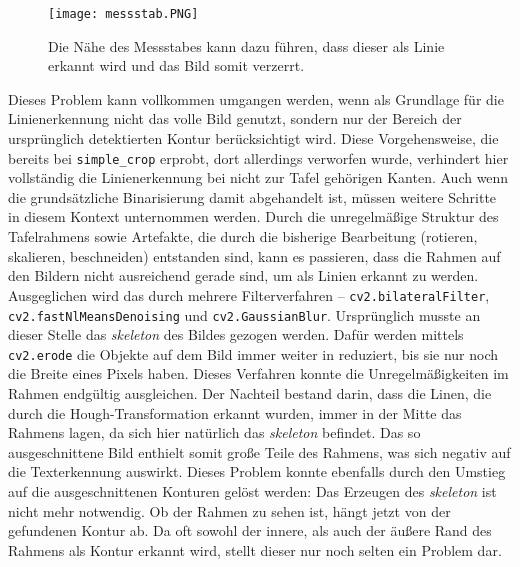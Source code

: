 \begin{SCfigure}[1][h!]
\caption{Die Nähe des Messstabes kann dazu führen, dass dieser als Linie erkannt wird und das Bild somit verzerrt.}
\texttt{[image: messstab.PNG]}
\end{SCfigure}

Dieses Problem kann vollkommen umgangen werden, wenn als Grundlage für die Linienerkennung nicht das volle Bild genutzt, sondern nur der Bereich der ursprünglich detektierten Kontur berücksichtigt wird. Diese Vorgehensweise, die bereits bei \verb|simple_crop| erprobt, dort allerdings verworfen wurde, verhindert hier vollständig die Linienerkennung bei nicht zur Tafel gehörigen Kanten.
Auch wenn die grundsätzliche Binarisierung damit abgehandelt ist, müssen weitere Schritte in diesem Kontext unternommen werden. Durch die unregelmäßige Struktur des Tafelrahmens sowie Artefakte, die durch die bisherige Bearbeitung (rotieren, skalieren, beschneiden) entstanden sind, kann es passieren, dass die Rahmen auf den Bildern nicht ausreichend gerade sind, um als Linien erkannt zu werden. Ausgeglichen wird das durch mehrere Filterverfahren -- \verb|cv2.bilateralFilter|, \verb|cv2.fastNlMeansDenoising| und \verb|cv2.GaussianBlur|. Ursprünglich musste an dieser Stelle das \textit{skeleton} des Bildes gezogen werden. Dafür werden mittels \verb|cv2.erode| die Objekte auf dem Bild immer weiter in reduziert, bis sie nur noch die Breite eines Pixels haben. Dieses Verfahren konnte die Unregelmäßigkeiten im Rahmen endgültig ausgleichen. Der Nachteil bestand darin, dass die Linen, die durch die Hough-Transformation erkannt wurden, immer in der Mitte das Rahmens lagen, da sich hier natürlich das \textit{skeleton} befindet. Das so ausgeschnittene Bild enthielt somit große Teile des Rahmens, was sich negativ auf die Texterkennung auswirkt. Dieses Problem konnte ebenfalls durch den Umstieg auf die ausgeschnittenen Konturen gelöst werden: Das Erzeugen des \textit{skeleton} ist nicht mehr notwendig. Ob der Rahmen zu sehen ist, hängt jetzt von der gefundenen Kontur ab. Da oft sowohl der innere, als auch der äußere Rand des Rahmens als Kontur erkannt wird, stellt dieser nur noch selten ein Problem dar.
